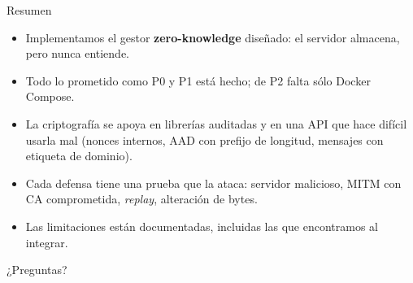 \documentclass[aspectratio=169,10pt]{beamer}
\begin{document}
\begin{frame}{Resumen}
  \begin{itemize}
    \item Implementamos el gestor \textbf{zero-knowledge} diseñado: el servidor almacena, pero
          nunca entiende.
    \item Todo lo prometido como P0 y P1 está hecho; de P2 falta sólo Docker Compose.
    \item La criptografía se apoya en librerías auditadas y en una API que hace difícil usarla
          mal (nonces internos, AAD con prefijo de longitud, mensajes con etiqueta de dominio).
    \item Cada defensa tiene una prueba que la ataca: servidor malicioso, MITM con CA
          comprometida, \emph{replay}, alteración de bytes.
    \item Las limitaciones están documentadas, incluidas las que encontramos al integrar.
  \end{itemize}
  \vspace{4mm}
  \centering
  {\Large ¿Preguntas?}
\end{frame}
\end{document}
